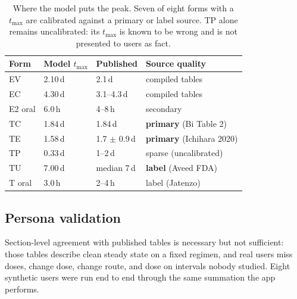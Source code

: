 \documentclass[11pt,a4paper]{article}
\newcommand{\bad}[1]{\textcolor{warn}{#1}}
\newcommand{\good}[1]{\textcolor{ok}{#1}}
\begin{document}
\begin{table}[h]
\centering
\small
\begin{tabular}{@{}llll@{}}
\toprule
\textbf{Form} & \textbf{Model $t_{\max}$} & \textbf{Published} & \textbf{Source quality} \\
\midrule
EV      & 2.10\,d & 2.1\,d & compiled tables \\
EC      & 4.30\,d & 3.1--4.3\,d & compiled tables \\
E2 oral & \good{6.0\,h} & \good{4--8\,h} & secondary \\
TC      & \good{1.84\,d} & \good{1.84\,d} & \textbf{primary} (Bi Table 2) \\
TE      & \good{1.58\,d} & \good{1.7 $\pm$ 0.9\,d} & \textbf{primary} (Ichihara 2020) \\
TP      & \bad{0.33\,d} & \bad{1--2\,d} & sparse (uncalibrated) \\
TU      & \good{7.00\,d} & \good{median 7\,d} & \textbf{label} (Aveed FDA) \\
T oral  & \good{3.0\,h} & \good{2--4\,h} & label (Jatenzo) \\
\bottomrule
\end{tabular}
\caption{Where the model puts the peak. Seven of eight forms with a
$t_{\max}$ are calibrated against a primary or label source. TP alone
remains uncalibrated: its $t_{\max}$ is known to be wrong and is not
presented to users as fact.}
\label{tab:tmax}
\end{table}

\subsection{Persona validation}
\label{sec:personas}

Section-level agreement with published tables is necessary but not
sufficient: those tables describe clean steady state on a fixed regimen,
and real users miss doses, change dose, change route, and dose on
intervals nobody studied. Eight synthetic users were run end to end
through the same summation the app performs.
\end{document}

